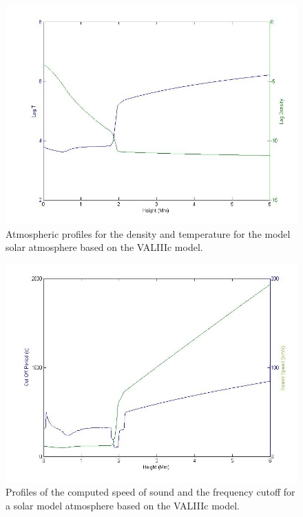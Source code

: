 \documentclass[physics,article,submit,pdftex,moreauthors]{Definitions/mdpi}
\begin{document}
\begin{figure}[h]\label{soundspeedVAL3C_profile_fig1R}
\includegraphics[scale=1.8]{VAL3C_rho_temp_fig1L.jpg}
\caption{Atmospheric profiles for the density and temperature for the model solar atmosphere based on the VALIIIc model.}
\end{figure}

\begin{figure}[h]\label{soundspeedVAL3C_profile_fig1L}
\includegraphics[scale=1.8]{soundspeedVAL3C_profile_fig1R.jpg}
\caption{Profiles of the computed speed of sound and the frequency cutoff for a solar model atmosphere based on the VALIIIc model.  }
\end{figure}
\end{document}
